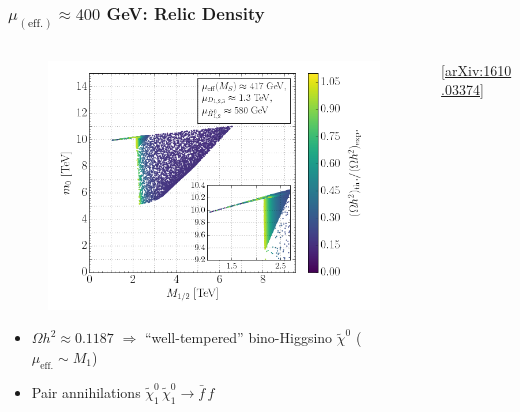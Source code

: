 \documentclass[10pt,aspectratio=169]{beamer}
\begin{document}
\begin{frame}
  \frametitle{$\mu_{(\text{eff.})} \approx 400$ GeV: Relic Density}
  \begin{columns}[t]
    \begin{column}{0.5\textwidth}
      \vspace{-16pt}
      \begin{figure}
        \includegraphics[width=\textwidth]{cse6ssm_mupos400GeV_m12m0_Omega}
      \end{figure}
      \vspace{-12pt}
      \begin{itemize}
        \item $\Omega h^2 \approx 0.1187$ $\Rightarrow$ ``well-tempered''
          bino-Higgsino $\tilde{\chi}^0$ ($\mu_{\text{eff.}} \sim M_1$)
        \item Pair annihilations $\tilde{\chi}_1^0\,\tilde{\chi}_1^0
          \rightarrow \bar{f}\,f$
      \end{itemize}
    \end{column}
    \begin{column}{0.5\textwidth}
      \vspace{-23pt}
      \begin{center}
        \tiny [\href{https://arxiv.org/abs/1610.03374}{arXiv:1610.03374}]
      \end{center}
      \vspace{-19pt}
      \begin{figure}

\end{figure}
\end{column}
\end{columns}
\end{frame}
\end{document}
